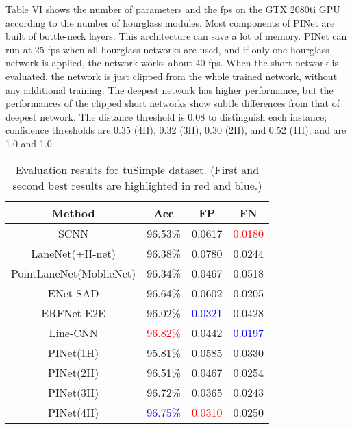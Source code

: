 \documentclass[journal]{IEEEtran}
\begin{document}
Table VI shows the number of parameters and the fps on the GTX 2080ti GPU according to the number of hourglass modules. Most components of PINet are built of bottle-neck layers. This architecture can save a lot of memory. PINet can run at 25 fps when all hourglass networks are used, and if only one hourglass network is applied, the network works about 40 fps. When the short network is evaluated, the network is just clipped from the whole trained network, without any additional training. The deepest network has higher performance, but the performances of the clipped short networks show subtle differences from that of deepest network. The distance threshold is 0.08 to distinguish each instance; confidence thresholds are 0.35 (4H), 0.32 (3H), 0.30 (2H), and 0.52 (1H);  and  are 1.0 and 1.0. 

\begin{table}[ht]
    \caption{Evaluation results for tuSimple dataset. \newline(First and second best results are highlighted in red and blue.)}
    \begin{center}
        \begin{tabular}{|c|c|c|c|}
            \hline
            Method & Acc & FP & FN\\
            \hline
            \hline
            SCNN \cite{pan2018spatial} & 96.53\% & 0.0617 & \textcolor{red}{0.0180}\\
            \hline
            LaneNet(+H-net) \cite{neven2018towards} & 96.38\% & 0.0780 & 0.0244\\
            \hline
            PointLaneNet(MoblieNet)\cite{chen2019pointlanenet} & 96.34\% & 0.0467 & 0.0518\\
            \hline
            ENet-SAD\cite{hou2019learning} & 96.64\% & 0.0602 & 0.0205\\
            \hline
            ERFNet-E2E \cite{yoo2020end} & 96.02\% & \textcolor{blue}{0.0321} & 0.0428\\
            \hline
            Line-CNN \cite{8624563} & \textcolor{red}{96.82\%} & 0.0442 & \textcolor{blue}{0.0197}\\
            \hline
            \hline
            PINet(1H) & 95.81\% & 0.0585 & 0.0330\\
            \hline
            PINet(2H) & 96.51\% & 0.0467 & 0.0254 \\
            \hline
            PINet(3H)& 96.72\%  & 0.0365 &  0.0243\\
            \hline
            PINet(4H)& \textcolor{blue}{96.75\%}  & \textcolor{red}{0.0310} &  0.0250\\
            \hline
        \end{tabular}
    \end{center}
\end{table}
\end{document}
